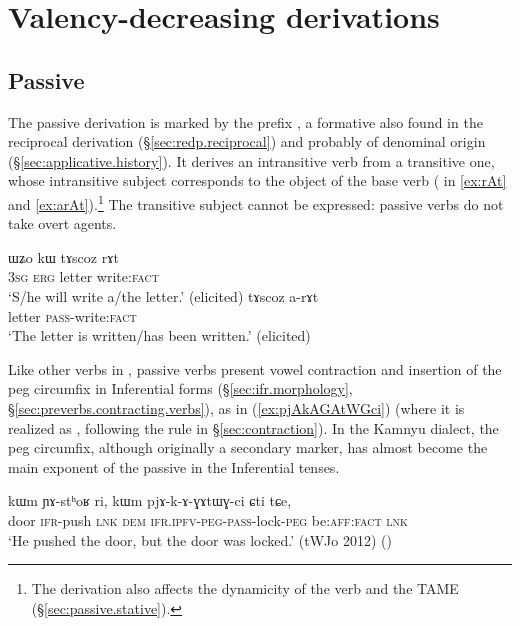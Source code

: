 \chapter{Valency-decreasing derivations}  \label{chap:valency.decreasing.derivation}

 
\section{Passive} \label{sec:passive}
The passive derivation is marked by the prefix  , a formative also found in the reciprocal derivation (§\ref{sec:redp.reciprocal}) and probably of denominal origin (§\ref{sec:applicative.history}). It derives an intransitive verb from a transitive one, whose intransitive subject corresponds to the object of the base verb ( in \ref{ex:rAt} and \ref{ex:arAt}).\footnote{The derivation also affects the dynamicity of the verb and the TAME (§\ref{sec:passive.stative}). } The transitive subject cannot be expressed: passive verbs do not take overt agents.

\begin{exe}
	\ex 
	\begin{xlist}	
		\ex \label{ex:rAt}
		\gll ɯʑo kɯ tɤscoz rɤt \\
		\textsc{3sg} \textsc{erg} letter write:\textsc{fact} \\
		\glt `S/he will write a/the letter.' (elicited)
		\ex \label{ex:arAt}
		\gll tɤscoz a-rɤt \\
		letter \textsc{pass}-write:\textsc{fact} \\
		\glt `The letter is written/has been written.' (elicited)
	\end{xlist}	
\end{exe}


Like other verbs in , passive verbs present vowel contraction and insertion of the peg circumfix  in Inferential forms (§\ref{sec:ifr.morphology}, §\ref{sec:preverbs.contracting.verbs}), as in (\ref{ex:pjAkAGAtWGci}) (where it is realized as , following the rule in §\ref{sec:contraction}). In the Kamnyu dialect, the peg circumfix, although originally a secondary marker, has almost become the main exponent of the passive in the Inferential tenses.

\begin{exe}
\ex \label{ex:pjAkAGAtWGci}
 \gll kɯm ɲɤ-stʰoʁ ri, kɯm pjɤ-k-ɤ-ɣɤtɯɣ-ci ɕti tɕe,  \\
 door \textsc{ifr}-push \textsc{lnk} \textsc{dem} \textsc{ifr}.\textsc{ipfv}-\textsc{peg}-\textsc{pass}-lock-\textsc{peg} be:\textsc{aff}:\textsc{fact} \textsc{lnk} \\
\glt  `He pushed the door, but the door was locked.' (tWJo 2012) ()
\end{exe} 

